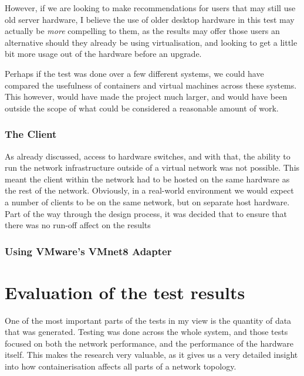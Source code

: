 However, if we are looking to make recommendations for users that may still use old server hardware, I believe the use of older desktop hardware in this test may actually be \emph{more} compelling to them, as the results may offer those users an alternative should they already be using virtualisation, and looking to get a little bit more usage out of the hardware before an upgrade.

Perhaps if the test was done over a few different systems, we could have compared the usefulness of containers and virtual machines across these systems. This however, would have made the project much larger, and would have been outside the scope of what could be considered a reasonable amount of work.

\subsubsection{The Client}
\label{ClientHardwareLimitation}
As already discussed, access to hardware switches, and with that, the ability to run the network infrastructure outside of a virtual network was not possible. This meant the client within the network had to be hosted on the same hardware as the rest of the network. Obviously, in a real-world environment we would expect a number of clients to be on the same network, but on separate host hardware.%
Part of the way through the design process, it was decided that to ensure that there was no run-off affect on the results

\subsubsection{Using VMware's VMnet8 Adapter}%

\section{Evaluation of the test results}
\label{sec:EvaluationTestResults}
One of the most important parts of the tests in my view is the quantity of data that was generated. Testing was done across the whole system, and those tests focused on both the network performance, and the performance of the hardware itself. This makes the research very valuable, as it gives us a very detailed insight into how containerisation affects all parts of a network topology.

